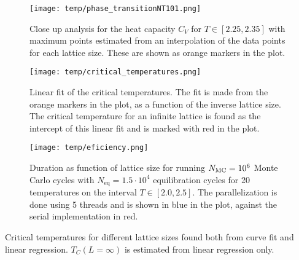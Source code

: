 \begin{figure}[!ht]
    \texttt{[image: temp/phase\_transitionNT101.png]} 
    \caption{Close up analysis for the heat capacity $C_V$ for $T\in[2.25, 2.35]$ with maximum points estimated from an interpolation of the data points for each lattice size. These are shown as orange markers in the plot.}
    \label{fig:phase_transition_zoomed}
\end{figure} 

\begin{figure}[!ht]
    \texttt{[image: temp/critical\_temperatures.png]} 
    \caption{Linear fit of the critical temperatures. The fit is made from the orange markers in the plot, as a function of the inverse lattice size. The critical temperature for an infinite lattice is found as the intercept of this linear fit and is marked with red in the plot. }
    \label{fig:critical_temperatures}
\end{figure} 

\begin{figure}[!ht]
    \texttt{[image: temp/eficiency.png]} 
    \caption{Duration as function of lattice size for running $N_\mathrm{MC}=10^6$ Monte Carlo cycles with $N_\mathrm{eq}=1.5\cdot 10^4$ equilibration cycles for 20 temperatures on the interval $T\in[2.0,2.5]$. The parallelization is done using 5 threads and is shown in blue in the plot, against the serial implementation in red.} 
    \label{fig:efficiency}
\end{figure} 




\begin{table}[!ht]
    
    \caption{Critical temperatures for different lattice sizes found both from curve fit and linear regression. $T_C(L=\infty)$ is estimated from linear regression only.}
    \label{tab:critical_temperatures}
\end{table}


